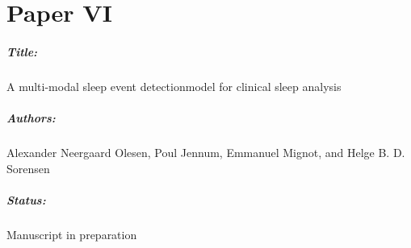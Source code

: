 \chapter{Paper VI}

\paragraph{Title:}
A multi-modal sleep event detectionmodel for clinical sleep analysis

\paragraph{Authors:}
Alexander Neergaard Olesen, Poul Jennum, Emmanuel Mignot, and Helge B. D. Sorensen

\paragraph{Status:}
Manuscript in preparation



